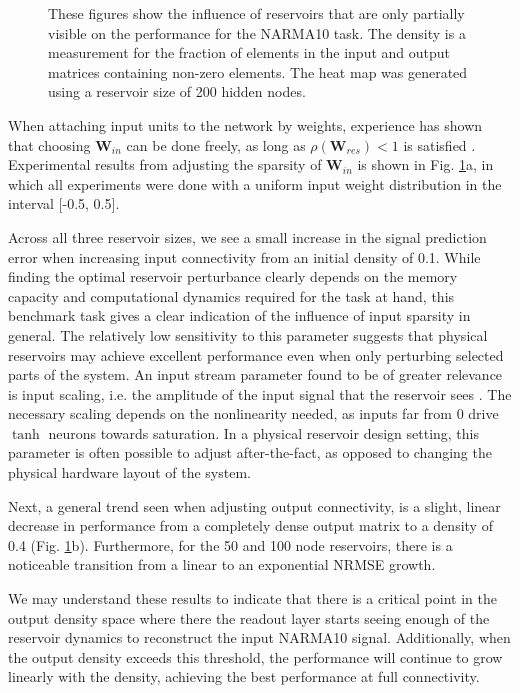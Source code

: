 \begin{figure}[htbp]
\begin{subfigure}{.3\textwidth}
    \caption{}
  \end{subfigure}
  \caption{
    These figures show the influence of reservoirs that are only partially
visible on the performance for the NARMA10 task. The density is a measurement
for the fraction of elements in the input and output matrices containing
non-zero elements. The heat map was generated using a reservoir size of 200
hidden nodes.
  }
  \label{partial_visibility}
\end{figure}

When attaching input units to the network by weights, experience has shown that
choosing $\mathbf{W}_{in}$ can be done freely, as long as
$\rho(\mathbf{W}_{res}) < 1$ is satisfied \cite{jaeger_echo_2001}. Experimental
results from adjusting the sparsity of $\mathbf{W}_{in}$ is shown in
Fig. \ref{partial_visibility}a, in which all experiments were done with a
uniform input weight distribution in the interval [-0.5, 0.5].

Across all three reservoir sizes, we see a small increase in the signal
prediction error when increasing input connectivity from an initial density of
0.1. While finding the optimal reservoir perturbance clearly depends on the
memory capacity and computational dynamics required for the task at hand, this
benchmark task gives a clear indication of the influence of input sparsity in
general. The relatively low sensitivity to this parameter suggests that physical
reservoirs may achieve excellent performance even when only perturbing selected
parts of the system. An input stream parameter found to be of greater relevance
is input scaling, i.e. the amplitude of the input signal that the reservoir sees
\cite{alippi_quantification_2009}. The necessary scaling depends on the
nonlinearity needed, as inputs far from 0 drive $\tanh$ neurons towards
saturation. In a physical reservoir design setting, this parameter is often
possible to adjust after-the-fact, as opposed to changing the physical hardware
layout of the system.

Next, a general trend seen when adjusting output connectivity, is a slight,
linear decrease in performance from a completely dense output matrix to a
density of 0.4 (Fig. \ref{partial_visibility}b). Furthermore, for the 50 and 100
node reservoirs, there is a noticeable transition from a linear to an
exponential NRMSE growth.

We may understand these results to indicate that there is a critical point in
the output density space where there the readout layer starts seeing enough of
the reservoir dynamics to reconstruct the input NARMA10 signal. Additionally,
when the output density exceeds this threshold, the performance will continue to
grow linearly with the density, achieving the best performance at full
connectivity.

